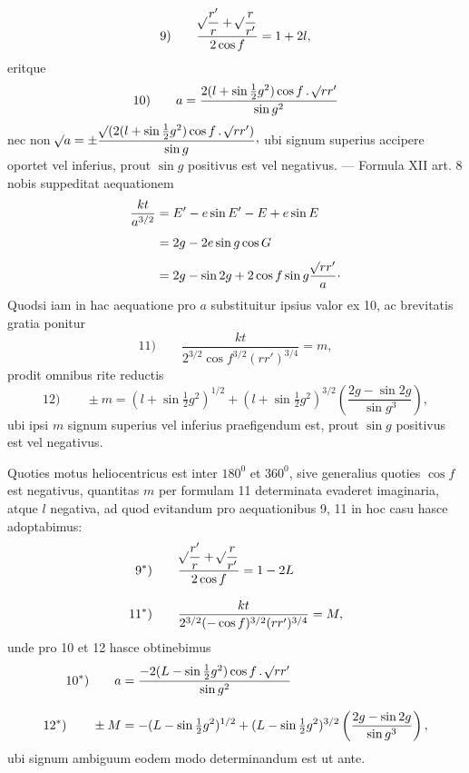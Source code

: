 \[
\mathrm{9)}\qquad\frac{\mathord{{}^{}\!\surd}\dfrac{r'}r+\mathord{{}^{}\!\surd}\dfrac{r}{r'}}{2\cos f}=1+2l,
\]
eritque
\[
\mathrm{10)}\qquad a=\frac{2(l+\sin\tfrac12g^2)\cos f\mathbin{.}\mathord{{}^{}\!\surd}rr'}{\sin g^2}
\]
nec non $\BareRoot{a}=\pm\dfrac{\BareRoot{(2(l+\sin\tfrac12g^2)\cos f\mathbin{.}\BareRoot{rr'})}}{\sin g}\mathpunct{\raisebox{.45ex}{,}}$ ubi signum superius accipere oportet vel inferius, prout $\sin g$ positivus est vel negativus. — Formula XII art. 8 nobis suppeditat aequationem
\[
\begin{aligned}
\frac{kt}{a^{3/2}}&=E'-e\sin E'-E+e\sin E\\[4pt]
&=2g-2e\sin g\cos G\\[4pt]
&=2g-\sin2g+2\cos f\sin g\frac{\mathord{{}^{}\!\surd}rr'}a\mathpunct{\cdot}
\end{aligned}
\]
Quodsi iam in hac aequatione pro $a$ substituitur ipsius valor ex 10, ac brevitatis gratia ponitur
\[
\mathrm{11)}\qquad\frac{kt}{2^{3/2}\cos f^{3/2}(rr')^{3/4}}=m,
\]
prodit omnibus rite reductis
\[
\mathrm{12)}\qquad\pm m=(l+\sin\tfrac12g^2)^{1/2}+(l+\sin\tfrac12g^2)^{3/2}\left(\frac{2g-\sin2g}{\sin g^3}\right),
\]
ubi ipsi $m$ signum superius vel inferius praefigendum est, prout $\sin g$ positivus est vel negativus.

Quoties motus heliocentricus est inter $180^0$ et $360^0$, sive generalius quoties $\cos f$ est negativus, quantitas $m$ per formulam 11 determinata evaderet imaginaria, atque $l$ negativa, ad quod evitandum pro aequationibus 9, 11 in hoc casu hasce adoptabimus:
\[
\begin{aligned}
\mathrm{9^*)}\qquad&\frac{\mathord{{}^{}\!\surd}\dfrac{r'}r+\mathord{{}^{}\!\surd}\dfrac{r}{r'}}{2\cos f}=1-2L\\[8pt]
\mathrm{11^*)}\qquad&\frac{kt}{2^{3/2}(-\cos f)^{3/2}(rr')^{3/4}}=M,
\end{aligned}
\]
unde pro 10 et 12 hasce obtinebimus
\[
\begin{aligned}
\mathrm{10^*)}\qquad a&=\frac{-2(L-\sin\tfrac12g^2)\cos f\mathbin{.}\mathord{{}^{}\!\surd}rr'}{\sin g^2}\\[8pt]
\mathrm{12^*)}\qquad\pm M&=-(L-\sin\tfrac12g^2)^{1/2}+(L-\sin\tfrac12g^2)^{3/2}\left(\frac{2g-\sin2g}{\sin g^3}\right),
\end{aligned}
\]
ubi signum ambiguum eodem modo determinandum est ut ante.
